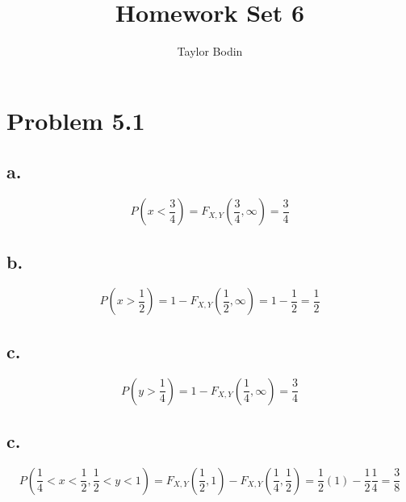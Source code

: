 \documentclass[12pt]{article}
\begin{document}
\title{Homework Set 6}
\author{Taylor Bodin}
\maketitle

\section*{Problem 5.1}
\subsection*{a.}
\[P(x<\frac{3}{4}) = F_{X,Y}(\frac{3}{4},\infty) = \frac{3}{4} \]

\subsection*{b.}
\[P(x>\frac{1}{2}) = 1 - F_{X,Y}(\frac{1}{2},\infty) = 1 - \frac{1}{2} = \frac{1}{2} \]

\subsection*{c.}
\[P(y>\frac{1}{4}) = 1 - F_{X,Y}(\frac{1}{4},\infty) = \frac{3}{4} \]

\subsection*{c.}
\[P(\frac{1}{4}<x<\frac{1}{2},\frac{1}{2}<y<1) = F_{X,Y}(\frac{1}{2},1)-F_{X,Y}(\frac{1}{4},\frac{1}{2}) 
= \frac{1}{2}(1)-\frac{1}{2}\frac{1}{4} = \frac{3}{8} \]
\end{document}
